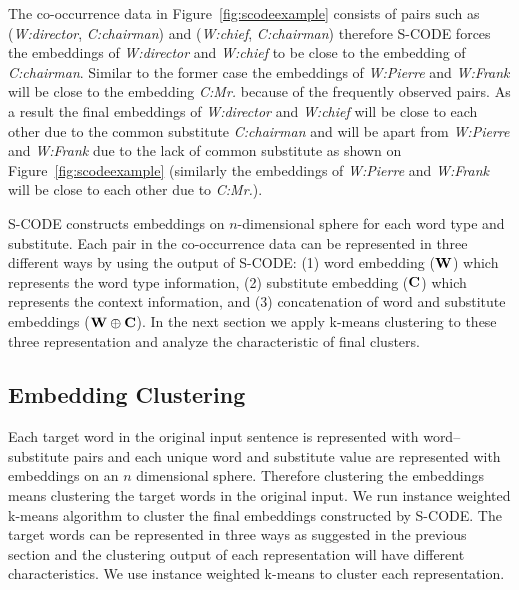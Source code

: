 The co-occurrence data in Figure~\ref{fig:scodeexample} consists of
pairs such as (\textit{W:director}, \textit{C:chairman}) and
(\textit{W:chief}, \textit{C:chairman}) therefore S-CODE forces the
embeddings of \textit{W:director} and \textit{W:chief} to be close to
the embedding of \textit{C:chairman}.  Similar to the former case the
embeddings of \textit{W:Pierre} and \textit{W:Frank} will be close to
the embedding \textit{C:Mr.} because of the frequently observed pairs.
As a result the final embeddings of \textit{W:director} and
\textit{W:chief} will be close to each other due to the common
substitute \textit{C:chairman} and will be apart from
\textit{W:Pierre} and \textit{W:Frank} due to the lack of common
substitute as shown on Figure~\ref{fig:scodeexample} (similarly the
embeddings of \textit{W:Pierre} and \textit{W:Frank} will be close to
each other due to \textit{C:Mr.}).

S-CODE constructs embeddings on $n$-dimensional sphere for each word
type and substitute.  Each pair in the co-occurrence data can be
represented in three different ways by using the output of S-CODE: (1)
word embedding (${\bf W}$) which represents the word type information,
(2) substitute embedding (${\bf C}$) which represents the context
information, and (3) concatenation of word and substitute embeddings
(${\bf W}\oplus{\bf C}$).  In the next section we apply k-means
clustering to these three representation and analyze the
characteristic of final clusters.

\subsection{Embedding Clustering}
\label{sec:clustering}

Each target word in the original input sentence is represented with
word--substitute pairs and each unique word and substitute value are
represented with embeddings on an $n$ dimensional sphere.  Therefore
clustering the embeddings means clustering the target words in the
original input.  We run instance weighted k-means algorithm to cluster
the final embeddings constructed by S-CODE.  The target words can be
represented in three ways as suggested in the previous section and the
clustering output of each representation will have different
characteristics.  We use instance weighted k-means to cluster each
representation.

